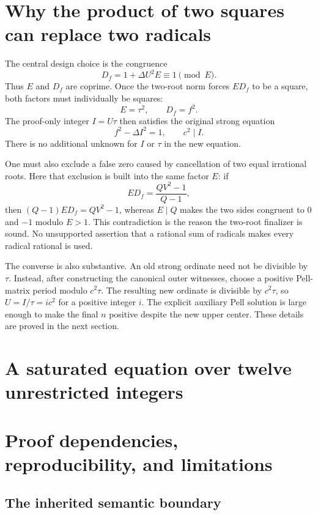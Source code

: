 \documentclass[11pt,letterpaper]{article}
\theoremstyle{remark}\newtheorem{remark}[theorem]{Remark}
\begin{document}
\section{Why the product of two squares can replace two radicals}
\label{sec:product-explanation}

The central design choice is the congruence
\[
 D_f=1+\Delta U^2E\equiv1\pmod E.
\]
Thus $E$ and $D_f$ are coprime.  Once the two-root norm forces
$ED_f$ to be a square, both factors must individually be squares:
\[
 E=\tau^2,\qquad D_f=f^2.
\]
The proof-only integer $I=U\tau$ then satisfies the original strong
equation
\[
 f^2-\Delta I^2=1,\qquad c^2\mid I.
\]
There is no additional unknown for $I$ or $\tau$ in the new equation.

One must also exclude a false zero caused by cancellation of two equal
irrational roots.  Here that exclusion is built into the same factor $E$:
if
\[
 ED_f=\frac{QV^2-1}{Q-1},
\]
then $(Q-1)ED_f=QV^2-1$, whereas $E\mid Q$ makes the two sides
congruent to $0$ and $-1$ modulo $E>1$.  This contradiction is the reason
the two-root finalizer is sound.  No unsupported assertion that a rational
sum of radicals makes every radical rational is used.

The converse is also substantive.  An old strong ordinate need not be
divisible by $\tau$.  Instead, after constructing the canonical outer
witnesses, choose a positive Pell-matrix period modulo $c^2\tau$.
The resulting new ordinate is divisible by $c^2\tau$, so
$U=I/\tau=ic^2$ for a positive integer $i$.  The explicit auxiliary
Pell solution is large enough to make the final $n$ positive despite the
new upper center.  These details are proved in the next section.





\section{A saturated equation over twelve unrestricted integers}


\section{Proof dependencies, reproducibility, and limitations}
\label{sec:dependencies}

\subsection{The inherited semantic boundary}
\end{document}
